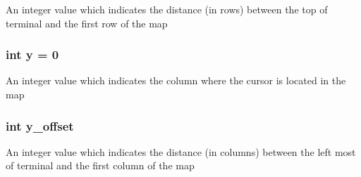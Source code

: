 An integer value which indicates the distance (in rows) between the top of terminal and the first row of the map \hypertarget{pacman-level-editor_8c_a0a2f84ed7838f07779ae24c5a9086d33}{
\subsubsection[{y}]{\setlength{\rightskip}{0pt plus 5cm}int y = 0}}\label{pacman-level-editor_8c_a0a2f84ed7838f07779ae24c5a9086d33}
An integer value which indicates the column where the cursor is located in the map \hypertarget{pacman-level-editor_8c_abaa275d8b2c76fd77dd271402a4425d3}{
\subsubsection[{y\-\_\-offset}]{\setlength{\rightskip}{0pt plus 5cm}int y\-\_\-offset}}\label{pacman-level-editor_8c_abaa275d8b2c76fd77dd271402a4425d3}
An integer value which indicates the distance (in columns) between the left most of terminal and the first column of the map 